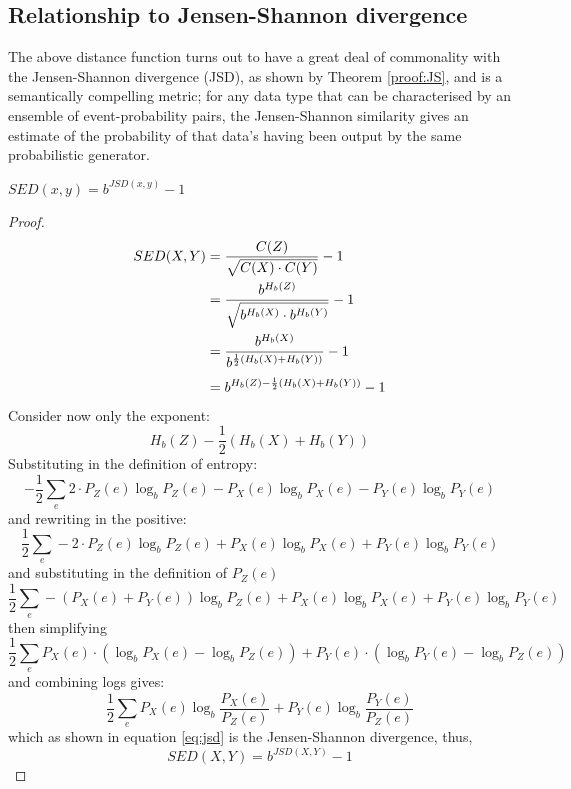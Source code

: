\subsection{Relationship to Jensen-Shannon divergence}
The above distance function turns out to have a great deal of commonality with the Jensen-Shannon divergence (JSD), as shown by Theorem \ref{proof:JS}, and is a semantically compelling metric; for any data type that can be characterised by an ensemble of event-probability pairs, the Jensen-Shannon similarity gives an estimate of the probability of that data's having been output by the same probabilistic generator.
\begin{mytheorem}{$SED(x,y) = b^{JSD(x,y)} - 1$}
\begin{proof}\label{proof:JS}\footnotesize
\begin{align}
SED(X,Y) &= \frac{C(Z)}{\sqrt{C(X) \cdot C(Y)}} - 1\\
%
&= \frac{b^{H_b(Z)}}{\sqrt{\strut b^{H_b(X)} \cdot b^{H_b(Y)}}} - 1\\
%
&= \frac{b^{H_b(X)}}{\strut b^{\frac{1}{2}(H_b(X) + H_b(Y))}} - 1\\
%
&= b^{H_b(Z) -\frac{1}{2}(H_b(X) + H_b(Y))} - 1
\end{align}
Consider now only the exponent:
\begin{equation}
H_b(Z) -\frac{1}{2}(H_b(X) + H_b(Y))
\end{equation}
Substituting in the definition of entropy:
\begin{equation}
-\frac{1}{2}\sum_e 2 \cdot P_{Z}(e) \log_b P_{Z}(e) - P_{X}(e) \log_b P_{X}(e) - P_{Y}(e) \log_b P_{Y}(e)
\end{equation}
and rewriting in the positive:
\begin{equation}
\frac{1}{2}\sum_e -2 \cdot P_{Z}(e) \log_b P_{Z}(e) + P_{X}(e) \log_b P_{X}(e) + P_{Y}(e) \log_b P_{Y}(e)
\end{equation}
and substituting in the definition of $P_{Z}(e)$
\begin{equation}
\frac{1}{2}\sum_e -(P_{X}(e) + P_{Y}(e)) \log_b P_{Z}(e) + P_{X}(e) \log_b P_{X}(e) + P_{Y}(e) \log_b P_{Y}(e)
\end{equation}
then simplifying
\begin{equation}
\frac{1}{2}\sum_e P_{X}(e)\cdot ( \log_b P_{X}(e) - \log_b P_{Z}(e)) + P_{Y}(e) \cdot ( \log_b P_{Y}(e) - \log_b P_{Z}(e))
\end{equation}
and combining logs gives:
\begin{equation}
\frac{1}{2}\sum_e P_{X}(e) \log_b \frac{P_{X}(e)}{P_{Z}(e)} + P_{Y}(e) \log_b \frac{P_{Y}(e)}{P_{Z}(e)}
\end{equation}
which as shown in equation \ref{eq:jsd} is the Jensen-Shannon divergence, thus,
\begin{equation}
SED(X,Y) = b^{JSD(X,Y)} - 1
\end{equation}

\end{proof}
\end{mytheorem}

